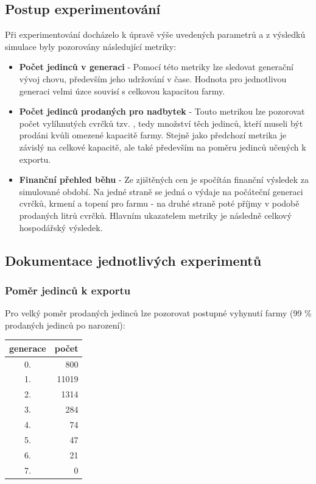 \documentclass[11pt, a4paper, titlepage]{article}
\begin{document}
    \subsection{Postup experimentování}

    Při experimentování docházelo k úpravě výše uvedených parametrů a z výsledků simulace byly pozorovány následující
    metriky:

    \begin{itemize}
        \item \textbf{Počet jedinců v generaci} - Pomocí této metriky lze sledovat generační vývoj chovu, především
        jeho udržování v čase. Hodnota pro jednotlivou generaci velmi úzce souvisí s celkovou kapacitou farmy.
        \item \textbf{Počet jedinců prodaných pro nadbytek} - Touto metrikou lze pozorovat počet vylíhnutých cvrčků tzv. ,
        tedy množství těch jedinců, kteří museli být prodáni kvůli omezené kapacitě farmy. Stejně jako předchozí metrika
        je závislý na celkové kapacitě, ale také především na poměru jedinců učených k exportu.
        \item \textbf{Finanční přehled běhu} - Ze zjištěných cen je spočítán finanční výsledek za simulované období.
        Na jedné straně se jedná o výdaje na počáteční generaci cvrčků, krmení a topení pro farmu - na druhé straně poté
        příjmy v podobě prodaných litrů cvrčků. Hlavním ukazatelem metriky je následně celkový hospodářský výsledek.
    \end{itemize}

    \subsection{Dokumentace jednotlivých experimentů}

    \subsubsection{Poměr jedinců k exportu}
    Pro velký poměr prodaných jedinců lze pozorovat postupné vyhynutí farmy (99 \% prodaných jedinců po narození):
    \begin{table}[H]
        \begin{tabular}{|c|r|}
            \hline
            generace & počet \\
            \hline
             0. &  800  \\
             1. &  11019  \\
             2. &  1314  \\
             3. &  284  \\
             4. &  74  \\
             5. &  47  \\
             6. &  21  \\
             7. &  0  \\
            \hline
        \end{tabular}
    \end{table}
\end{document}
